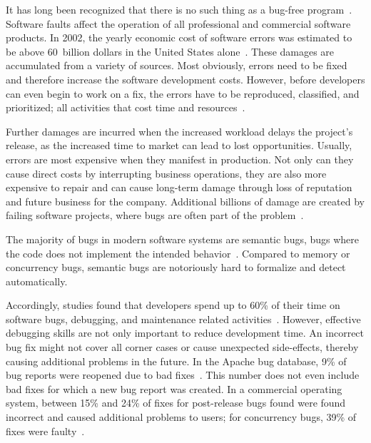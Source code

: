 It has long been recognized that there is no such thing as a bug-free program~\cite{schwartz71:an_overview_of_bugs}.
Software faults affect the operation of all professional and commercial software products.
In 2002, the yearly economic cost of software errors was estimated to be above 60~billion dollars in the United States alone~\cite{tassey02:the_economic_impacts}. 
These damages are accumulated from a variety of sources.
Most obviously, errors need to be fixed and therefore increase the software development costs.
However, before developers can even begin to work on a fix, the errors have to be reproduced, classified, and prioritized; all activities that cost time and resources~\cite{sahoo10:an_empirical_study, guo10:characterizing_and_predicting_which}.

Further damages are incurred when the increased workload delays the project's release, as the increased time to market can lead to lost opportunities.
Usually, errors are most expensive when they manifest in production.
Not only can they cause direct costs by interrupting business operations, they are also more expensive to repair and can cause long-term damage through loss of reputation and future business for the company.
Additional billions of damage are created by failing software projects, where bugs are often part of the problem~\cite{charette05:why_software_fails, zhivich09:the_real_cost}. 


\medskip\medskip\noindent
The majority of bugs in modern software systems are semantic bugs, \ie bugs where the code does not implement the intended behavior~\cite{li06:have_things_changed_now}.
Compared to memory or concurrency bugs, semantic bugs are notoriously hard to formalize and detect automatically.

Accordingly, studies found that developers spend up to 60\% of their time on software bugs, debugging, and maintenance related activities~\cite{ballou08:improving_software_quality, hailpern02:software_debugging_testing, beizer03:software_testing_techniques}.
However, effective debugging skills are not only important to reduce development time.
An incorrect bug fix might not cover all corner cases or cause unexpected side-effects, thereby causing additional problems in the future.
In the Apache bug database, 9\% of bug reports were reopened due to bad fixes~\cite{gu10:has_the_bug_really}.
This number does not even include bad fixes for which a new bug report was created.
In a commercial operating system, between 15\% and 24\% of fixes for post-release bugs found were found incorrect and caused additional problems to users; for concurrency bugs, 39\% of fixes were faulty~\cite{yin11:how_do_fixes_become}.

